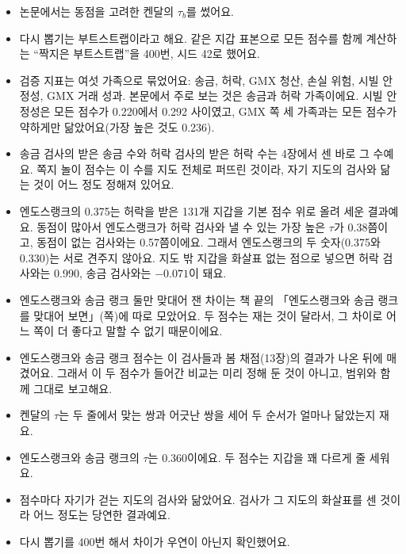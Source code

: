 \begin{deeper}[진짜 이름과 숫자]
\begin{itemize}
\item 논문에서는 동점을 고려한 켄달의 $\tau_b$를 썼어요.
\item 다시 뽑기는 부트스트랩이라고 해요. 같은 지갑 표본으로 모든 점수를 함께 계산하는 “짝지은 부트스트랩”을 400번, 시드 42로 했어요.
\item 검증 지표는 여섯 가족으로 묶었어요: 송금, 허락, GMX 청산, 손실 위험, 시빌 안정성, GMX 거래 성과. 본문에서 주로 보는 것은 송금과 허락 가족이에요. 시빌 안정성은 모든 점수가 0.220에서 0.292 사이였고, GMX 쪽 세 가족과는 모든 점수가 약하게만 닮았어요(가장 높은 것도 0.236).
\item 송금 검사의 받은 송금 수와 허락 검사의 받은 허락 수는 4장에서 센 바로 그 수예요. 쪽지 놀이 점수는 이 수를 지도 전체로 퍼뜨린 것이라, 자기 지도의 검사와 닮는 것이 어느 정도 정해져 있어요.
\item 엔도스랭크의 0.375는 허락을 받은 131개 지갑을 기본 점수 위로 올려 세운 결과예요. 동점이 많아서 엔도스랭크가 허락 검사와 낼 수 있는 가장 높은 $\tau$가 0.38쯤이고, 동점이 없는 검사와는 0.57쯤이에요. 그래서 엔도스랭크의 두 숫자(0.375와 0.330)는 서로 견주지 않아요. 지도 밖 지갑을 화살표 없는 점으로 넣으면 허락 검사와는 0.990, 송금 검사와는 $-0.071$이 돼요.
\item 엔도스랭크와 송금 랭크 둘만 맞대어 잰 차이는 책 끝의 「엔도스랭크와 송금 랭크를 맞대어 보면」(\pageref{ch:er-awp-side}쪽)에 따로 모았어요. 두 점수는 재는 것이 달라서, 그 차이로 어느 쪽이 더 좋다고 말할 수 없기 때문이에요.
\item 엔도스랭크와 송금 랭크 점수는 이 검사들과 봄 채점(13장)의 결과가 나온 뒤에 매겼어요. 그래서 이 두 점수가 들어간 비교는 미리 정해 둔 것이 아니고, 범위와 함께 그대로 보고해요.
\end{itemize}
\end{deeper}

\begin{learned}
\begin{itemize}
\item 켄달의 $\tau$는 두 줄에서 맞는 쌍과 어긋난 쌍을 세어 두 순서가 얼마나 닮았는지 재요.
\item 엔도스랭크와 송금 랭크의 $\tau$는 0.360이에요. 두 점수는 지갑을 꽤 다르게 줄 세워요.
\item 점수마다 자기가 걷는 지도의 검사와 닮았어요. 검사가 그 지도의 화살표를 센 것이라 어느 정도는 당연한 결과예요.
\item 다시 뽑기를 400번 해서 차이가 우연이 아닌지 확인했어요.
\end{itemize}
\end{learned}

